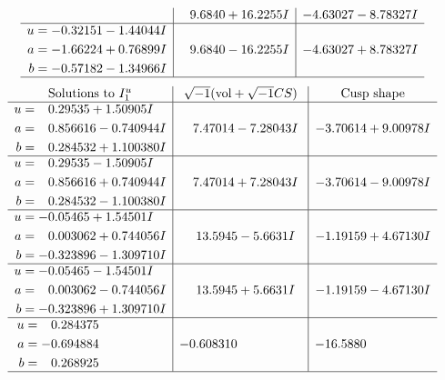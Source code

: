 \documentclass[1p]{elsarticle_modified}
\theoremstyle{definition}
\newcommand{\I}{\sqrt{-1}}
\begin{document}
$$\begin{array}{c|c|c}
 & \phantom{-}9.6840 + 16.2255 I & -4.63027 - 8.78327 I \\ \hline\begin{aligned}
u &= -0.32151 - 1.44044 I \\
a &= -1.66224 + 0.76899 I \\
b &= -0.57182 - 1.34966 I\end{aligned}
 & \phantom{-}9.6840 - 16.2255 I & -4.63027 + 8.78327 I\\
 \hline 
 \end{array}$$\newpage$$\begin{array}{c|c|c}  
\text{Solutions to }I^u_{1}& \I (\text{vol} + \sqrt{-1}CS) & \text{Cusp shape}\\
 \hline 
\begin{aligned}
u &= \phantom{-}0.29535 + 1.50905 I \\
a &= \phantom{-}0.856616 - 0.740944 I \\
b &= \phantom{-}0.284532 + 1.100380 I\end{aligned}
 & \phantom{-}7.47014 - 7.28043 I & -3.70614 + 9.00978 I \\ \hline\begin{aligned}
u &= \phantom{-}0.29535 - 1.50905 I \\
a &= \phantom{-}0.856616 + 0.740944 I \\
b &= \phantom{-}0.284532 - 1.100380 I\end{aligned}
 & \phantom{-}7.47014 + 7.28043 I & -3.70614 - 9.00978 I \\ \hline\begin{aligned}
u &= -0.05465 + 1.54501 I \\
a &= \phantom{-}0.003062 + 0.744056 I \\
b &= -0.323896 - 1.309710 I\end{aligned}
 & \phantom{-}13.5945 - 5.6631 I & -1.19159 + 4.67130 I \\ \hline\begin{aligned}
u &= -0.05465 - 1.54501 I \\
a &= \phantom{-}0.003062 - 0.744056 I \\
b &= -0.323896 + 1.309710 I\end{aligned}
 & \phantom{-}13.5945 + 5.6631 I & -1.19159 - 4.67130 I \\ \hline\begin{aligned}
u &= \phantom{-}0.284375\phantom{ +0.000000I} \\
a &= -0.694884\phantom{ +0.000000I} \\
b &= \phantom{-}0.268925\phantom{ +0.000000I}\end{aligned}
 & -0.608310\phantom{ +0.000000I} & -16.5880\phantom{ +0.000000I}\\
 \hline 
 \end{array}$$\newpage\newpage\renewcommand{\arraystretch}{1}
\end{document}
